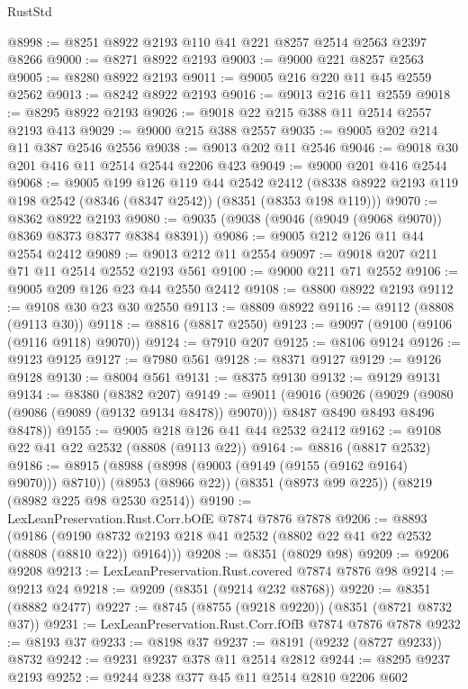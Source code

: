 \begin{lexlean}{RustStd}
\begin{coremodule}
@8998 := @8251 @8922 @2193 @110 @41 @221 @8257 @2514 @2563 @2397 @8266
@9000 := @8271 @8922 @2193
@9003 := @9000 @221 @8257 @2563
@9005 := @8280 @8922 @2193
@9011 := @9005 @216 @220 @11 @45 @2559 @2562
@9013 := @8242 @8922 @2193
@9016 := @9013 @216 @11 @2559
@9018 := @8295 @8922 @2193
@9026 := @9018 @22 @215 @388 @11 @2514 @2557 @2193 @413
@9029 := @9000 @215 @388 @2557
@9035 := @9005 @202 @214 @11 @387 @2546 @2556
@9038 := @9013 @202 @11 @2546
@9046 := @9018 @30 @201 @416 @11 @2514 @2544 @2206 @423
@9049 := @9000 @201 @416 @2544
@9068 := @9005
    @199
    @126
    @119
    @44
    @2542
    @2412
    (@8338 @8922 @2193 @119 @198 @2542 (@8346 (@8347 @2542)) (@8351 (@8353 @198 @119)))
@9070 := @8362 @8922 @2193
@9080 := @9035 (@9038 (@9046 (@9049 (@9068 @9070)) @8369 @8373 @8377 @8384 @8391))
@9086 := @9005 @212 @126 @11 @44 @2554 @2412
@9089 := @9013 @212 @11 @2554
@9097 := @9018 @207 @211 @71 @11 @2514 @2552 @2193 @561
@9100 := @9000 @211 @71 @2552
@9106 := @9005 @209 @126 @23 @44 @2550 @2412
@9108 := @8800 @8922 @2193
@9112 := @9108 @30 @23 @30 @2550
@9113 := @8809 @8922
@9116 := @9112 (@8808 (@9113 @30))
@9118 := @8816 (@8817 @2550)
@9123 := @9097 (@9100 (@9106 (@9116 @9118) @9070))
@9124 := @7910 @207
@9125 := @8106 @9124
@9126 := @9123 @9125
@9127 := @7980 @561
@9128 := @8371 @9127
@9129 := @9126 @9128
@9130 := @8004 @561
@9131 := @8375 @9130
@9132 := @9129 @9131
@9134 := @8380 (@8382 @207)
@9149 := @9011
    (@9016
      (@9026
        (@9029 (@9080 (@9086 (@9089 (@9132 @9134 @8478)) @9070)))
        @8487
        @8490
        @8493
        @8496
        @8478))
@9155 := @9005 @218 @126 @41 @44 @2532 @2412
@9162 := @9108 @22 @41 @22 @2532 (@8808 (@9113 @22))
@9164 := @8816 (@8817 @2532)
@9186 := @8915
    (@8988 (@8998 (@9003 (@9149 (@9155 (@9162 @9164) @9070))) @8710))
    (@8953 (@8966 @22))
    (@8351 (@8973 @99 @225))
    (@8219 (@8982 @225 @98 @2530 @2514))
@9190 := LexLeanPreservation.Rust.Corr.bOfE @7874 @7876 @7878
@9206 := @8893
    (@9186 (@9190 @8732 @2193 @218 @41 @2532 (@8802 @22 @41 @22 @2532 (@8808 (@8810 @22)) @9164)))
@9208 := @8351 (@8029 @98)
@9209 := @9206 @9208
@9213 := LexLeanPreservation.Rust.covered @7874 @7876 @98
@9214 := @9213 @24
@9218 := @9209 (@8351 (@9214 @232 @8768))
@9220 := @8351 (@8882 @2477)
@9227 := @8745 (@8755 (@9218 @9220)) (@8351 (@8721 @8732 @37))
@9231 := LexLeanPreservation.Rust.Corr.fOfB @7874 @7876 @7878
@9232 := @8193 @37
@9233 := @8198 @37
@9237 := @8191 (@9232 (@8727 @9233)) @8732
@9242 := @9231 @9237 @378 @11 @2514 @2812
@9244 := @8295 @9237 @2193
@9252 := @9244 @238 @377 @45 @11 @2514 @2810 @2206 @602

\end{coremodule}
\end{lexlean}
